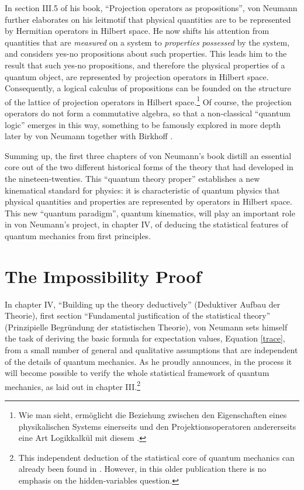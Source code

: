 \documentclass[11pt]{article}
\begin{document}
In section III.5 of his book, ``Projection operators as propositions'', von Neumann further elaborates on his leitmotif that physical quantities are to be represented by Hermitian operators in Hilbert space. He now shifts his attention from quantities that are \emph{measured} on a system to \emph{properties} \emph{possessed} by the system, and considers yes-no propositions about such properties. This leads him to the result that such yes-no propositions, and therefore the physical properties of a quantum object, are represented by projection operators in Hilbert space. Consequently, a logical calculus of propositions can be founded on the structure of the lattice of projection operators in Hilbert space.\footnote{Wie man sieht, erm\"{o}glicht die Beziehung zwischen den Eigenschaften eines physikalischen Systems einerseits und den Projektionsoperatoren andererseits eine Art Logikkalk\"{u}l mit diesem \cite[p.\@ 134]{VN1}.} Of course, the projection operators do not form a commutative algebra, so that a non-classical ``quantum logic'' emerges in this way, something to be famously explored in more depth later by von Neumann together with Birkhoff \cite{birkhoff}.

Summing up, the first three chapters of von Neumann's book distill an essential core out of the two different historical forms of the theory that had developed in the nineteen-twenties. This ``quantum theory proper'' establishes a new kinematical standard for physics: it is characteristic of quantum physics that physical quantities and properties are represented by operators in Hilbert space. This new ``quantum paradigm'', quantum kinematics, will play an important role in von Neumann's project, in chapter IV, of deducing the statistical features of quantum mechanics from first principles.

\section{The Impossibility Proof}\label{proof}

In chapter IV, ``Building up the theory deductively'' (Deduktiver Aufbau der Theorie), first section ``Fundamental justification of the statistical theory'' (Prinzipielle Begr\"{u}ndung der statistischen Theorie), von Neumann sets himself the task of deriving the basic formula for expectation values, Equation \ref{trace}, from a small number of general and qualitative assumptions that are independent of the details of quantum mechanics. As he proudly announces, in the process it will become possible to verify the whole statistical framework of quantum mechanics, as laid out in chapter III.\footnote{This independent deduction of the statistical core of quantum mechanics can already been found in \cite{VN2}. However, in this older publication there is no emphasis on the hidden-variables question.}
\end{document}
